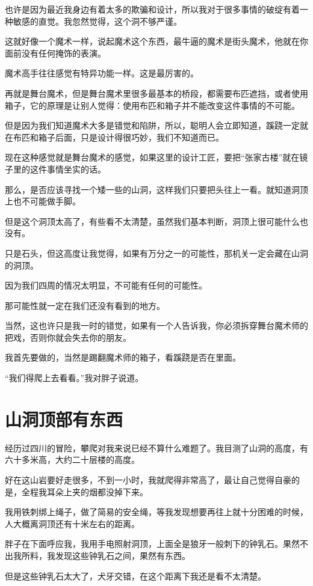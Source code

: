 也许是因为最近我身边有着太多的欺骗和设计，所以我对于很多事情的破绽有着一种敏感的直觉。我忽然觉得，这个洞不够严谨。

这就好像一个魔术一样，说起魔术这个东西，最牛逼的魔术是街头魔术，他就在你面前没有任何掩饰的表演。

魔术高手往往感觉有特异功能一样。这是最厉害的。

再就是舞台魔术，但是舞台魔术里很多最基本的桥段，都需要布匹遮挡，或者使用箱子，它的原理是让别人觉得：使用布匹和箱子并不能改变这件事情的不可能。

但是因为我们知道魔术大多是错觉和陷阱，所以，聪明人会立即知道，蹊跷一定就在布匹和箱子后面，只是设计得很巧妙，我们不知道而已。

现在这种感觉就是舞台魔术的感觉，如果这里的设计工匠，要把“张家古楼”就在镜子里的这件事情坐实的话。

那么，是否应该寻找一个矮一些的山洞，这样我们只要把头往上一看。就知道洞顶上也不可能做手脚。

但是这个洞顶太高了，有些看不太清楚，虽然我们基本判断，洞顶上很可能什么也没有。

只是石头，但这高度让我觉得，如果有万分之一的可能性，那机关一定会藏在山洞的洞顶。

因为我们四周的情况太明显，不可能有任何的可能性。

那可能性就一定在我们还没有看到的地方。

当然，这也许只是我一时的错觉，如果有一个人告诉我，你必须拆穿舞台魔术师的把戏，否则你就会失去你的朋友。

我首先要做的，当然是踢翻魔术师的箱子，看蹊跷是否在里面。

“我们得爬上去看看。”我对胖子说道。

\chapter{山洞顶部有东西}

经历过四川的冒险，攀爬对我来说已经不算什么难题了。我目测了山洞的高度，有六十多米高，大约二十层楼的高度。

好在这山岩要好走很多，不到一小时，我就爬得非常高了，最让自己觉得自豪的是，全程我耳朵上夹的烟都没掉下来。

我用铁刺绑上绳子，做了简易的安全绳，等我发现想要再往上就十分困难的时候，人大概离洞顶还有十米左右的距离。

胖子在下面呼应我，我用手电照射洞顶，上面全是狼牙一般刺下的钟乳石。果然不出我所料，我发现这些钟乳石之间，果然有东西。

但是这些钟乳石太大了，犬牙交错，在这个距离下我还是看不太清楚。

